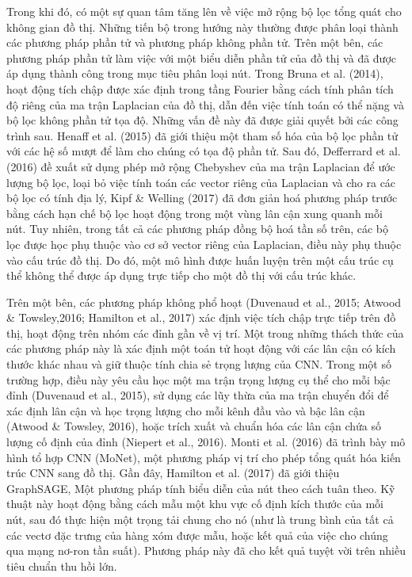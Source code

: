 Trong khi đó, có một sự quan tâm tăng lên về việc mở rộng bộ lọc tổng quát cho không gian đồ thị. Những tiến bộ trong hướng này thường được phân loại thành các phương pháp phần tử và phương pháp không phần tử. Trên một bên, các phương pháp phần tử làm việc với một biểu diễn phần tử của đồ thị và đã được áp dụng thành công trong mục tiêu phân loại nút. Trong Bruna et al. (2014), hoạt động tích chập được xác định trong tầng Fourier bằng cách tính phân tích độ riêng của ma trận Laplacian của đồ thị, dẫn đến việc tính toán có thể nặng và bộ lọc không phần tử tọa độ. Những vấn đề này đã được giải quyết bởi các công trình sau. Henaff et al. (2015) đã giới thiệu một tham số hóa của bộ lọc phần tử với các hệ số mượt để làm cho chúng có tọa độ phần tử. Sau đó, Defferrard et al. (2016) đề xuất sử dụng phép mở rộng Chebyshev của ma trận Laplacian để ước lượng bộ lọc, loại bỏ việc tính toán các vector riêng của Laplacian và cho ra các bộ lọc có tính địa lý, Kipf & Welling (2017) đã đơn giản hoá phương pháp trước bằng cách hạn chế bộ lọc hoạt động trong một vùng lân cận xung quanh mỗi nút. Tuy nhiên, trong tất cả các phương pháp đồng bộ hoá tần số trên, các bộ lọc được học phụ thuộc vào cơ sở vector riêng của Laplacian, điều này phụ thuộc vào cấu trúc đồ thị. Do đó, một mô hình được huấn luyện trên một cấu trúc cụ thể không thể được áp dụng trực tiếp cho một đồ thị với cấu trúc khác.

Trên một bên, các phương pháp không phổ hoạt (Duvenaud et al., 2015; Atwood & Towsley,2016; Hamilton et al., 2017) xác định việc tích chập trực tiếp trên đồ thị, hoạt động trên nhóm các đỉnh gần về vị trí. Một trong những thách thức của các phương pháp này là xác định một toán tử hoạt động với các lân cận có kích thước khác nhau và giữ thuộc tính chia sẻ trọng lượng của CNN. Trong một số trường hợp, điều này yêu cầu học một ma trận trọng lượng cụ thể cho mỗi bậc đỉnh (Duvenaud et al., 2015), sử dụng các lũy thừa của ma trận chuyển đổi để xác định lân cận và học trọng lượng cho mỗi kênh đầu vào và bậc lân cận (Atwood & Towsley, 2016), hoặc trích xuất và chuẩn hóa các lân cận chứa số lượng cố định của đỉnh (Niepert et al., 2016). Monti et al. (2016) đã trình bày mô hình tổ hợp CNN (MoNet), một phương pháp vị trí cho phép tổng quát hóa kiến trúc CNN sang đồ thị. Gần đây, Hamilton et al. (2017) đã giới thiệu GraphSAGE, Một phương pháp tính biểu diễn của nút theo cách tuân theo. Kỹ thuật này hoạt động bằng cách mẫu một khu vực cố định kích thước của mỗi nút, sau đó thực hiện một trọng tải chung cho nó (như là trung bình của tất cả các vectơ đặc trưng của hàng xóm được mẫu, hoặc kết quả của việc cho chúng qua mạng nơ-ron tần suất). Phương pháp này đã cho kết quả tuyệt vời trên nhiều tiêu chuẩn thu hồi lớn.


